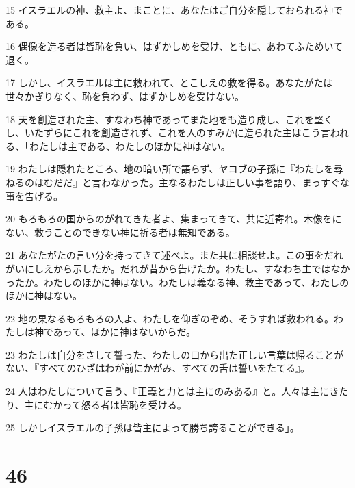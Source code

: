 \par 15 イスラエルの神、救主よ、まことに、あなたはご自分を隠しておられる神である。
\par 16 偶像を造る者は皆恥を負い、はずかしめを受け、ともに、あわてふためいて退く。
\par 17 しかし、イスラエルは主に救われて、とこしえの救を得る。あなたがたは世々かぎりなく、恥を負わず、はずかしめを受けない。
\par 18 天を創造された主、すなわち神であってまた地をも造り成し、これを堅くし、いたずらにこれを創造されず、これを人のすみかに造られた主はこう言われる、「わたしは主である、わたしのほかに神はない。
\par 19 わたしは隠れたところ、地の暗い所で語らず、ヤコブの子孫に『わたしを尋ねるのはむだだ』と言わなかった。主なるわたしは正しい事を語り、まっすぐな事を告げる。
\par 20 もろもろの国からのがれてきた者よ、集まってきて、共に近寄れ。木像をにない、救うことのできない神に祈る者は無知である。
\par 21 あなたがたの言い分を持ってきて述べよ。また共に相談せよ。この事をだれがいにしえから示したか。だれが昔から告げたか。わたし、すなわち主ではなかったか。わたしのほかに神はない。わたしは義なる神、救主であって、わたしのほかに神はない。
\par 22 地の果なるもろもろの人よ、わたしを仰ぎのぞめ、そうすれば救われる。わたしは神であって、ほかに神はないからだ。
\par 23 わたしは自分をさして誓った、わたしの口から出た正しい言葉は帰ることがない、『すべてのひざはわが前にかがみ、すべての舌は誓いをたてる』。
\par 24 人はわたしについて言う、『正義と力とは主にのみある』と。人々は主にきたり、主にむかって怒る者は皆恥を受ける。
\par 25 しかしイスラエルの子孫は皆主によって勝ち誇ることができる」。

\chapter{46}

